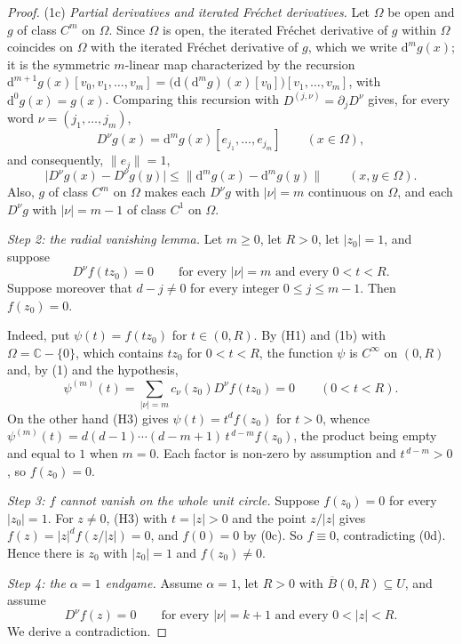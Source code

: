 \begin{proof}
\noindent(1c) \emph{Partial derivatives and iterated Fréchet derivatives.}  Let
$\Omega$ be open and $g$ of class $C^m$ on $\Omega$.  Since $\Omega$ is open,
the iterated Fréchet derivative of $g$ within $\Omega$ coincides on $\Omega$
with the iterated Fréchet derivative of $g$, which we write
$\mathrm{d}^mg(x)$; it is the symmetric $m$-linear map characterized by the
recursion $\mathrm{d}^{m+1}g(x)[v_0,v_1,\dots,v_m]
=\bigl(\mathrm{d}(\mathrm{d}^mg)(x)[v_0]\bigr)[v_1,\dots,v_m]$, with
$\mathrm{d}^0g(x)=g(x)$.  Comparing this recursion with
$D^{(j,\nu)}=\partial_jD^\nu$ gives, for every word $\nu=(j_1,\dots,j_m)$,
\begin{equation}\tag{2}
  D^\nu g(x)=\mathrm{d}^mg(x)[e_{j_1},\dots,e_{j_m}]\qquad(x\in\Omega),
\end{equation}
and consequently, $\|e_j\|=1$,
\begin{equation}\tag{3}
  \bigl|D^\nu g(x)-D^\nu g(y)\bigr|
  \le\bigl\|\mathrm{d}^mg(x)-\mathrm{d}^mg(y)\bigr\|\qquad(x,y\in\Omega).
\end{equation}
Also, $g$ of class $C^m$ on $\Omega$ makes each $D^\nu g$ with $|\nu|=m$
continuous on $\Omega$, and each $D^\nu g$ with $|\nu|=m-1$ of class $C^1$ on
$\Omega$.

\emph{Step 2: the radial vanishing lemma.}  Let $m\ge0$, let $R>0$, let
$|z_0|=1$, and suppose
\[
  D^\nu f(tz_0)=0\qquad\text{for every }|\nu|=m\text{ and every }0<t<R .
\]
Suppose moreover that $d-j\neq0$ for every integer $0\le j\le m-1$.  Then
$f(z_0)=0$.

Indeed, put $\psi(t)=f(tz_0)$ for $t\in(0,R)$.  By (H1) and (1b) with
$\Omega=\mathbb{C}-\{0\}$, which contains $tz_0$ for $0<t<R$, the function
$\psi$ is $C^\infty$ on $(0,R)$ and, by (1) and the hypothesis,
\[
  \psi^{(m)}(t)=\sum_{|\nu|=m}c_\nu(z_0)D^\nu f(tz_0)=0\qquad(0<t<R).
\]
On the other hand (H3) gives $\psi(t)=t^{d}f(z_0)$ for $t>0$, whence
$\psi^{(m)}(t)=d(d-1)\cdots(d-m+1)\,t^{\,d-m}f(z_0)$, the product being empty
and equal to $1$ when $m=0$.  Each factor is non-zero by assumption and
$t^{\,d-m}>0$, so $f(z_0)=0$.

\emph{Step 3: $f$ cannot vanish on the whole unit circle.}  Suppose
$f(z_0)=0$ for every $|z_0|=1$.  For $z\neq0$, (H3) with $t=|z|>0$ and the
point $z/|z|$ gives $f(z)=|z|^{d}f(z/|z|)=0$, and $f(0)=0$ by (0c).  So
$f\equiv0$, contradicting (0d).  Hence there is $z_0$ with $|z_0|=1$ and
$f(z_0)\neq0$.

\emph{Step 4: the $\alpha=1$ endgame.}  Assume $\alpha=1$, let $R>0$ with
$\overline{B}(0,R)\subseteq U$, and assume
\begin{equation}\tag{4}
  D^\nu f(z)=0\qquad\text{for every }|\nu|=k+1\text{ and every }
  0<|z|<R .
\end{equation}
We derive a contradiction.


\end{proof}
